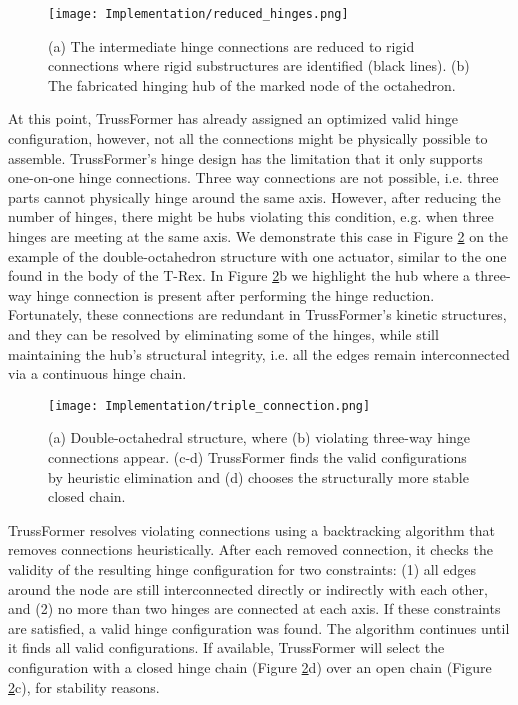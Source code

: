 \begin{figure}[ht!]
    \texttt{[image: Implementation/reduced\_hinges.png]}
    \centering
    \caption{(a) The intermediate hinge connections are reduced to rigid connections where rigid substructures are identified (black lines). (b) The fabricated hinging hub of the marked node of the octahedron.}
    \label{fig:reduced_hinges}
\end{figure}
At this point, TrussFormer has already assigned an optimized valid hinge configuration, however, not all the connections might be physically possible to assemble. TrussFormer’s hinge design
has the limitation that it only supports one-on-one hinge connections. Three way connections are not possible, i.e. three parts cannot physically hinge around the same axis.
However, after reducing the number of hinges, there might be hubs violating this condition, e.g. when three hinges are meeting at the same axis. We demonstrate this case in Figure \ref{fig:triple_connection} on the example of the double-octahedron structure with one actuator, similar to the one found in the body of the T-Rex. In Figure \ref{fig:triple_connection}b we highlight the hub where a three-way hinge connection is present after performing the hinge reduction. Fortunately, these connections are redundant in TrussFormer’s kinetic structures, and they can be resolved by eliminating some of the hinges, while still maintaining the hub’s structural integrity, i.e. all the edges remain interconnected via a continuous hinge chain.
\begin{figure}[ht!]
    \texttt{[image: Implementation/triple\_connection.png]}
    \centering
    \caption{(a) Double-octahedral structure, where (b) violating three-way hinge connections appear. (c-d) TrussFormer finds the valid configurations by heuristic elimination and (d) chooses the structurally more stable closed chain.}
    \label{fig:triple_connection}
\end{figure}
TrussFormer resolves violating connections using a backtracking algorithm that removes connections heuristically. After each removed connection, it checks the validity of the resulting hinge configuration for two constraints: (1) all edges around the node are still interconnected directly or indirectly with each other, and (2) no more than two hinges are connected at each axis. If these constraints are satisfied, a valid hinge configuration was found. The algorithm continues until it finds all valid configurations. If available, TrussFormer will select the configuration with a closed hinge chain (Figure \ref{fig:triple_connection}d) over an open chain (Figure \ref{fig:triple_connection}c), for stability reasons.

